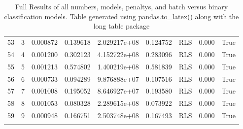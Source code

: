 \documentclass[12pt]{article}
\begin{document}
\begin{longtable}{lrrrrrlrl}
		53 &       3 &   0.000872 &  0.139618 &  2.029217e+08 &  0.124752 &    RLS &      0.000 &   True \\
		54 &       4 &   0.001200 &  0.302123 &  4.152722e+08 &  0.283096 &    RLS &      0.000 &   True \\
		55 &       5 &   0.001213 &  0.574802 &  1.400219e+08 &  0.581839 &    RLS &      0.000 &   True \\
		56 &       6 &   0.000733 &  0.094289 &  9.876888e+07 &  0.107516 &    RLS &      0.000 &   True \\
		57 &       7 &   0.001008 &  0.195052 &  8.646927e+07 &  0.193580 &    RLS &      0.000 &   True \\
		58 &       8 &   0.001053 &  0.080328 &  2.289615e+08 &  0.073922 &    RLS &      0.000 &   True \\
		59 &       9 &   0.000948 &  0.166751 &  2.503748e+08 &  0.167493 &    RLS &      0.000 &   True \\
		\bottomrule
	\caption{Full Results of all numbers, models, penaltys, and batch versus binary classification models. Table generated using pandas.to\_latex() along with the long table package}
	\end{longtable}
\end{document}
